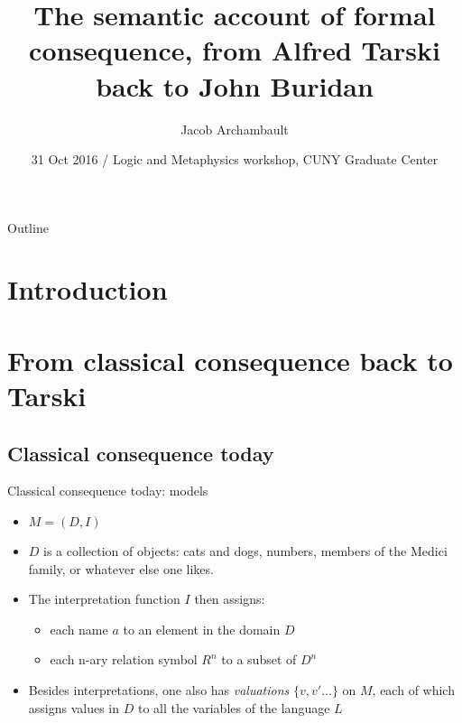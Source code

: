 \documentclass{beamer}
\title[] %
{The semantic account of formal consequence, from Alfred Tarski back to John Buridan}
\subtitle
{} %
\author[] %
{Jacob Archambault}
\institute[] %
{Fordham University}
\date[] %
{31 Oct 2016 / Logic and Metaphysics workshop, CUNY Graduate Center}
\begin{document}
\begin{frame}
  \titlepage
\end{frame}

\begin{frame}{Outline}
  \tableofcontents[pausesections]
\end{frame}




\section{Introduction}
\section{From classical consequence back to Tarski}
\subsection{Classical consequence today}

\begin{frame}{Classical consequence today: models}
	\begin{itemize}
		\item $M = (D, I)$ \pause 
		\item $D$ is  a collection of objects: cats and dogs, numbers, members of the Medici family, or whatever else one likes. 
		\pause
		\item The interpretation function $I$ then assigns: 
		
		 \pause
		 \begin{itemize}
		 	\item each name $a$ to an element in the domain $D$
		 	\pause
		 	\item each n-ary relation symbol $R^{n}$ to a subset of $D^{n}$
		 \end{itemize}
		 \pause 
		\item Besides interpretations, one also has \textit{valuations} $\{v, v' ...\}$ on $M$, each of which assigns values in $D$ to all the variables of the language $L$
	\end{itemize}
\end{frame}
	
\end{document}
